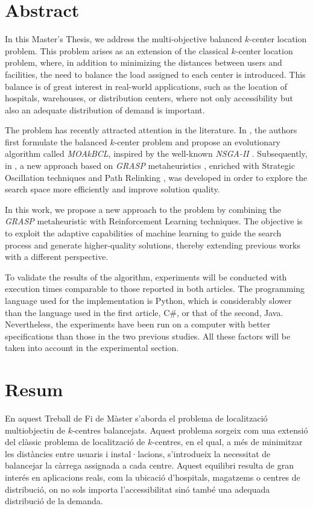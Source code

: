 \documentclass[12pt,a4paper]{book}
\begin{document}
\section*{Abstract}
In this Master's Thesis, we address the multi-objective balanced $k$-center location problem. This problem arises as an extension of the classical $k$-center location problem, where, in addition to minimizing the distances between users and facilities, the need to balance the load assigned to each center is introduced. This balance is of great interest in real-world applications, such as the location of hospitals, warehouses, or distribution centers, where not only accessibility but also an adequate distribution of demand is important.

The problem has recently attracted attention in the literature. In \cite{k-balanced_1}, the authors first formulate the balanced $k$-center problem and propose an evolutionary algorithm called \textit{MOAkBCL}, inspired by the well-known \textit{NSGA-II \citep{NSGA-II}}. Subsequently, in \cite{k-Balanced_2}, a new approach based on \textit{GRASP} metaheuristics \citep{GRASP}, enriched with Strategic Oscillation techniques \citep{oscillation} and Path Relinking \citep{path_relinking}, was developed in order to explore the search space more efficiently and improve solution quality.

In this work, we propose a new approach to the problem by combining the \textit{GRASP} metaheuristic with Reinforcement Learning techniques. The objective is to exploit the adaptive capabilities of machine learning to guide the search process and generate higher-quality solutions, thereby extending previous works with a different perspective.

To validate the results of the algorithm, experiments will be conducted with execution times comparable to those reported in both articles. The programming language used for the implementation is Python, which is considerably slower than the language used in the first article, C\#, or that of the second, Java. Nevertheless, the experiments have been run on a computer with better specifications than those in the two previous studies. All these factors will be taken into account in the experimental section.

\newpage

\section*{Resum}
En aquest Treball de Fi de Màster s'aborda el problema de localització multiobjectiu de $k$-centres balancejats. Aquest problema sorgeix com una extensió del clàssic problema de localització de $k$-centres, en el qual, a més de minimitzar les distàncies entre usuaris i instal·lacions, s'introdueix la necessitat de balancejar la càrrega assignada a cada centre. Aquest equilibri resulta de gran interés en aplicacions reals, com la ubicació d'hospitals, magatzems o centres de distribució, on no sols importa l'accessibilitat sinó també una adequada distribució de la demanda.
\end{document}
